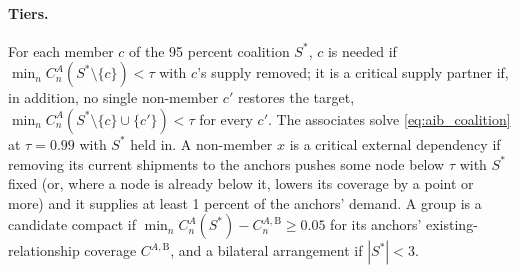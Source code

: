 \paragraph{Tiers.} For each member $c$ of the 95 percent coalition $S^{*}$, $c$ is needed if
$\min_nC^A_n(S^{*}\setminus\{c\})<\tau$ with $c$'s supply removed; it is a critical supply partner if,
in addition, no single non-member $c'$ restores the target,
$\min_nC^A_n(S^{*}\setminus\{c\}\cup\{c'\})<\tau$ for every $c'$. The associates solve
\eqref{eq:aib_coalition} at $\tau=0.99$ with $S^{*}$ held in. A non-member $x$ is a critical external
dependency if removing its current shipments to the anchors pushes some node below $\tau$ with $S^{*}$
fixed (or, where a node is already below it, lowers its coverage by a point or more) and it supplies at
least 1 percent of the anchors' demand. A group is a candidate compact if
$\min_n C^A_n(S^{*})-C^{A,\mathrm B}_n\ge0.05$ for its anchors' existing-relationship coverage
$C^{A,\mathrm B}$, and a bilateral arrangement if $|S^{*}|<3$.

